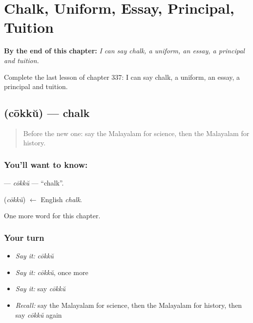 
\chapter{Chalk, Uniform, Essay, Principal, Tuition}
\label{ch:ml-chalk-uniform-essay-principal-tuition}

\begin{chapteropening}
\textbf{By the end of this chapter:} \emph{I can say chalk, a uniform, an essay, a principal and tuition.}

Complete the last lesson of chapter 337: I can say chalk, a uniform, an essay, a principal and tuition.
\end{chapteropening}

\section[\texorpdfstring{\ml{ചോക്ക്} (cōkkŭ)}{ചോക്ക് (cōkkŭ)}]{ (cōkkŭ) — chalk}

\label{lesson:ML-C337-cokku}



\begin{quote}
Before the new one: say the Malayalam for science, then the Malayalam for history.
\end{quote}

\subsection*{You'll want to know: }
\textbf{} — \emph{cōkkŭ} — \textquotedblleft{}chalk\textquotedblright{}.

\begin{cousinweb}
\textbf{} (\emph{cōkkŭ}) $\leftarrow$ English \emph{chalk}.
\end{cousinweb}

\begin{grammarlens}[title={What you've built}]
One more word for this chapter.
\end{grammarlens}

\subsection*{Your turn}
\begin{itemize}
\raggedright
  \item \emph{Say it:} \emph{cōkkŭ}
  \item \emph{Say it:} \emph{cōkkŭ}, once more
  \item \emph{Say it:} say \emph{cōkkŭ}
  \item \emph{Recall:} say the Malayalam for science, then the Malayalam for history, then say \emph{cōkkŭ} again
\end{itemize}


